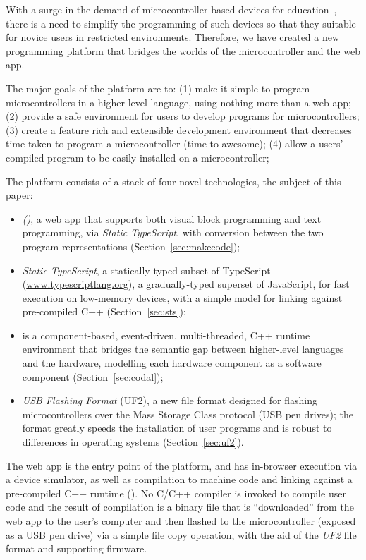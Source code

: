 With a surge in the demand of microcontroller-based devices for education~\cite{XYZ}, 
there is a need to simplify the programming of such devices so that they suitable 
for novice users in restricted environments.
Therefore, we have created a new programming platform that bridges the worlds of 
the microcontroller and the web app. 

The major goals of the platform are to:
(1) make it simple to program microcontrollers in a higher-level language,
using nothing more than a web app;
(2) provide a safe environment for users to develop programs for microcontrollers;
(3) create a feature rich and extensible development environment that decreases time taken to program a microcontroller (time to awesome);
(4) allow a users' compiled program to be easily installed on a microcontroller;


The platform consists of a stack of four novel technologies, the subject of
this paper:
\begin{itemize}
\item \emph{\MC ()}, a web app that supports both visual block programming and text programming,
via \emph{Static TypeScript}, with conversion between the two program representations (Section~\ref{sec:makecode});

\item \emph{Static TypeScript}, a statically-typed subset of TypeScript (\url{www.typescriptlang.org}),
a gradually-typed superset of JavaScript, for fast execution on low-memory devices, with
a simple model for linking against pre-compiled C++ (Section~\ref{sec:sts});

\item \emph{\CO} is a component-based, event-driven, multi-threaded, C++ runtime environment that bridges the semantic gap between higher-level languages and the hardware,
modelling each hardware component as a software component (Section~\ref{sec:codal});

\item \emph{USB Flashing Format} (UF2), a new file format designed for flashing microcontrollers 
over the Mass Storage Class protocol (USB pen drives); the format greatly speeds the installation of user
programs and is robust to differences in operating systems (Section~\ref{sec:uf2}).
\end{itemize}
The \MC web app is the entry point of the platform, and has in-browser execution via a device simulator, as well as compilation to machine code and linking against a
pre-compiled C++ runtime (\emph{\CON}). No C/C++ compiler is invoked to compile user code and the result of compilation is a binary file that is ``downloaded'' from the web app to the user's
computer and then flashed to the microcontroller (exposed as a USB pen drive) 
via a simple file copy operation,  with the aid of the \emph{UF2} file format and supporting firmware. 

